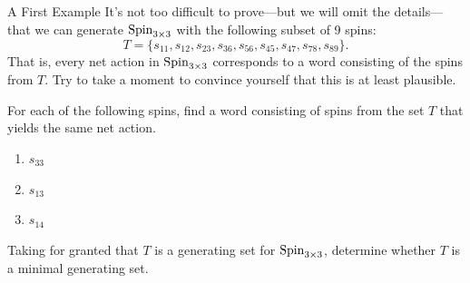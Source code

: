 \begin{section}{A First Example}
It's not too difficult to prove---but we will omit the details---that we can generate $\operatorname{Spin}_{3\times 3}$ with the following subset of 9 spins:
\[
T=\{s_{11}, s_{12}, s_{23}, s_{36}, s_{56}, s_{45}, s_{47}, s_{78}, s_{89}\}.
\]
That is, every net action in $\operatorname{Spin}_{3\times 3}$ corresponds to a word consisting of the spins from $T$.  Try to take a moment to convince yourself that this is at least plausible.  

\begin{problem}
For each of the following spins, find a word consisting of spins from the set $T$ that yields the same net action.
\begin{enumerate}[label=\rm{(\alph*)}]
\item $s_{33}$
\item $s_{13}$
\item $s_{14}$
\end{enumerate}
\end{problem}

\begin{problem}
Taking for granted that $T$ is a generating set for $\operatorname{Spin}_{3\times 3}$, determine whether $T$ is a minimal generating set.
\end{problem}

\end{section}


